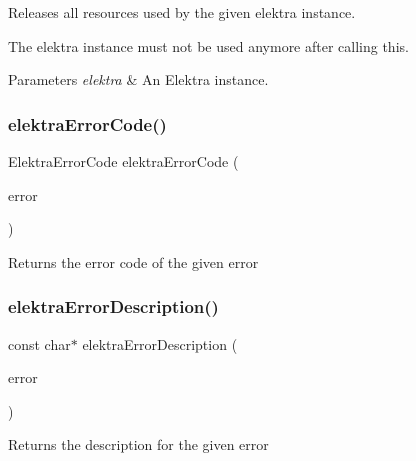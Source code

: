 Releases all resources used by the given elektra instance. 

The elektra instance must not be used anymore after calling this. 
\begin{DoxyParams}{Parameters}
{\em elektra} & An Elektra instance. \\
\hline
\end{DoxyParams}
\mbox{\label{group__highlevel_gaa78113745c933e9c0301837e4057cad6}} 
\subsubsection{\texorpdfstring{elektra\+Error\+Code()}{elektraErrorCode()}}
{\footnotesize\ttfamily Elektra\+Error\+Code elektra\+Error\+Code (\begin{DoxyParamCaption}\item[{const Elektra\+Error $\ast$}]{error }\end{DoxyParamCaption})}

\begin{DoxyReturn}{Returns}
the error code of the given error 
\end{DoxyReturn}
\mbox{\label{group__highlevel_ga781cda83af3981a55321e7c613afbef0}} 
\subsubsection{\texorpdfstring{elektra\+Error\+Description()}{elektraErrorDescription()}}
{\footnotesize\ttfamily const char$\ast$ elektra\+Error\+Description (\begin{DoxyParamCaption}\item[{const Elektra\+Error $\ast$}]{error }\end{DoxyParamCaption})}

\begin{DoxyReturn}{Returns}
the description for the given error 
\end{DoxyReturn}
\mbox{\label{group__highlevel_ga961716e42cf36d92cccdb64d7d2158cf}} 
